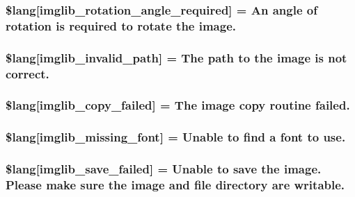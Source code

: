 \subsubsection[{\$lang}]{\setlength{\rightskip}{0pt plus 5cm}\$lang\mbox{[}\textquotesingle{}imglib\+\_\+rotation\+\_\+angle\+\_\+required\textquotesingle{}\mbox{]} = \textquotesingle{}An angle of rotation is required to rotate the image.\textquotesingle{}}\label{imglib__lang_8php_a1110d59ea8fd0564e78068dbda3438fb}
\hypertarget{imglib__lang_8php_a8ff486c25806a4731d1ffe20431df825}{}
\subsubsection[{\$lang}]{\setlength{\rightskip}{0pt plus 5cm}\$lang\mbox{[}\textquotesingle{}imglib\+\_\+invalid\+\_\+path\textquotesingle{}\mbox{]} = \textquotesingle{}The path to the image is not correct.\textquotesingle{}}\label{imglib__lang_8php_a8ff486c25806a4731d1ffe20431df825}
\hypertarget{imglib__lang_8php_a9363000d2005b8276b39d581a11b562d}{}
\subsubsection[{\$lang}]{\setlength{\rightskip}{0pt plus 5cm}\$lang\mbox{[}\textquotesingle{}imglib\+\_\+copy\+\_\+failed\textquotesingle{}\mbox{]} = \textquotesingle{}The image copy routine failed.\textquotesingle{}}\label{imglib__lang_8php_a9363000d2005b8276b39d581a11b562d}
\hypertarget{imglib__lang_8php_a935800aad2be18ca4fe99bb074674848}{}
\subsubsection[{\$lang}]{\setlength{\rightskip}{0pt plus 5cm}\$lang\mbox{[}\textquotesingle{}imglib\+\_\+missing\+\_\+font\textquotesingle{}\mbox{]} = \textquotesingle{}Unable to find {\bf a} font to use.\textquotesingle{}}\label{imglib__lang_8php_a935800aad2be18ca4fe99bb074674848}
\hypertarget{imglib__lang_8php_a4d7a99fddc60c97a7327fa0125dea264}{}
\subsubsection[{\$lang}]{\setlength{\rightskip}{0pt plus 5cm}\$lang\mbox{[}\textquotesingle{}imglib\+\_\+save\+\_\+failed\textquotesingle{}\mbox{]} = \textquotesingle{}Unable to save the image. Please make sure the image and file directory are writable.\textquotesingle{}}\label{imglib__lang_8php_a4d7a99fddc60c97a7327fa0125dea264}
